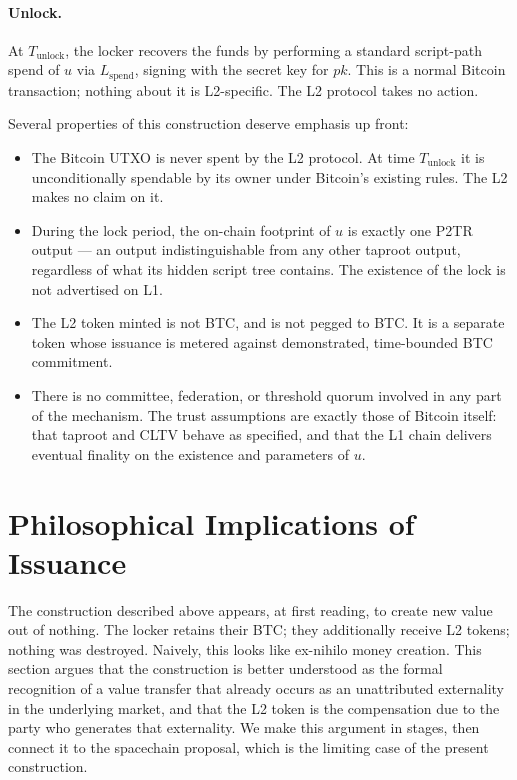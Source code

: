 \documentclass[11pt,a4paper]{article}
\begin{document}
\paragraph{Unlock.} At $T_{\mathrm{unlock}}$, the locker recovers the funds by performing a standard script-path spend of $u$ via $L_{\mathrm{spend}}$, signing with the secret key for $pk$. This is a normal Bitcoin transaction; nothing about it is L2-specific. The L2 protocol takes no action.

Several properties of this construction deserve emphasis up front:

\begin{itemize}[leftmargin=*]
  \item The Bitcoin UTXO is never spent by the L2 protocol. At time $T_{\mathrm{unlock}}$ it is unconditionally spendable by its owner under Bitcoin's existing rules. The L2 makes no claim on it.
  \item During the lock period, the on-chain footprint of $u$ is exactly one P2TR output --- an output indistinguishable from any other taproot output, regardless of what its hidden script tree contains. The existence of the lock is not advertised on L1.
  \item The L2 token minted is not BTC, and is not pegged to BTC. It is a separate token whose issuance is metered against demonstrated, time-bounded BTC commitment.
  \item There is no committee, federation, or threshold quorum involved in any part of the mechanism. The trust assumptions are exactly those of Bitcoin itself: that taproot and CLTV behave as specified, and that the L1 chain delivers eventual finality on the existence and parameters of $u$.
\end{itemize}

\section{Philosophical Implications of Issuance}
\label{sec:philosophy}

The construction described above appears, at first reading, to create new value out of nothing. The locker retains their BTC; they additionally receive L2 tokens; nothing was destroyed. Naively, this looks like ex-nihilo money creation. This section argues that the construction is better understood as the formal recognition of a value transfer that already occurs as an unattributed externality in the underlying market, and that the L2 token is the compensation due to the party who generates that externality. We make this argument in stages, then connect it to the spacechain proposal, which is the limiting case of the present construction.
\end{document}
